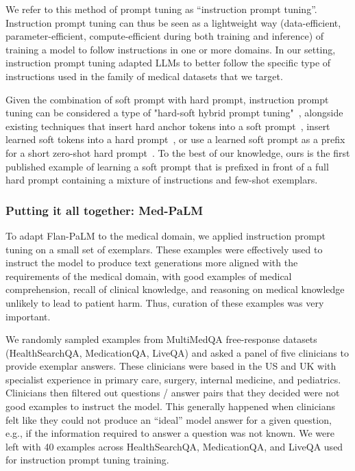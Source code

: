 \documentclass[10pt, letter, onecolumn]{arxiv}
\begin{document}
\begin{refsection}
We refer to this method of prompt tuning as ``instruction prompt tuning''. Instruction prompt tuning can thus be seen as a lightweight way (data-efficient, parameter-efficient, compute-efficient during both training and inference) of training a model to follow instructions in one or more domains. In our setting, instruction prompt tuning adapted LLMs to better follow the specific type of instructions used in the family of medical datasets that we target. 

Given the combination of soft prompt with hard prompt, instruction prompt tuning can be considered a type of "hard-soft hybrid prompt tuning"~\cite{liu2021pre}, alongside existing techniques that insert hard anchor tokens into a soft prompt~\cite{liu2021gpt}, insert learned soft tokens into a hard prompt~\cite{han2022ptr}, or use a learned soft prompt as a prefix for a short zero-shot hard prompt~\cite{gu2021ppt, ye2022retrieval}. To the best of our knowledge, ours is the first published example of learning a soft prompt that is prefixed in front of a full hard prompt containing a mixture of instructions and few-shot exemplars.

\subsubsection{Putting it all together: Med-PaLM} To adapt Flan-PaLM to the medical domain, we applied instruction prompt tuning on a small set of exemplars. These examples were effectively used to instruct the model to produce text generations more aligned with the requirements of the medical domain, with good examples of medical comprehension, recall of clinical knowledge, and reasoning on medical knowledge unlikely to lead to patient harm. Thus, curation of these examples was very important. 

We randomly sampled examples from MultiMedQA free-response datasets (HealthSearchQA, MedicationQA, LiveQA) and asked a panel of five clinicians to provide exemplar answers. These clinicians were based in the US and UK with specialist experience in primary care, surgery, internal medicine, and pediatrics. Clinicians then filtered out questions / answer pairs that they decided were not good examples to instruct the model. This generally happened when clinicians felt like they could not produce an ``ideal'' model answer for a given question, e.g., if the information required to answer a question was not known. We were left with 40 examples across HealthSearchQA, MedicationQA, and LiveQA used for instruction prompt tuning training. 


\end{refsection}
\end{document}
